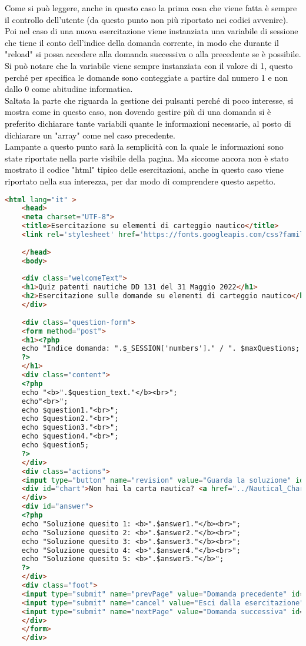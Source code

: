\textcolor{black}{Come si può leggere, anche in questo caso la prima cosa che viene fatta è sempre il controllo dell'utente (da questo punto non più riportato nei codici avvenire).  Poi nel caso di una nuova esercitazione viene instanziata una variabile di sessione che tiene il conto dell'indice della domanda corrente, in modo che durante il "reload" si possa accedere alla domanda successiva o alla precedente se è possibile. Si può notare che la variabile viene sempre instanziata con il valore di 1, questo perché per specifica le domande sono conteggiate a partire dal numero 1 e non dallo 0 come abitudine informatica.\\
Saltata la parte che riguarda la gestione dei pulsanti perché di poco interesse, si mostra come in questo caso, non dovendo gestire più di una domanda si è preferito dichiarare tante variabili quante le informazioni necessarie, al posto di dichiarare un "array" come nel caso precedente.\\
Lampante a questo punto sarà la semplicità con la quale le informazioni sono state riportate nella parte visibile della pagina. Ma siccome ancora non è stato mostrato il codice "html" tipico delle esercitazioni, anche in questo caso viene riportato nella sua interezza, per dar modo di comprendere questo aspetto.}\\

\begin{lstlisting}[language=html]
	<html lang="it" >
	<head>
	<meta charset="UTF-8">
	<title>Esercitazione su elementi di carteggio nautico</title>
	<link rel='stylesheet' href='https://fonts.googleapis.com/css?family=Rubik:400,700'><link rel="stylesheet" href="exerciseStyle.css">
	
	</head>
	<body>  
	
	<div class="welcomeText">
	<h1>Quiz patenti nautiche DD 131 del 31 Maggio 2022</h1>
	<h2>Esercitazione sulle domande su elementi di carteggio nautico</h2>
	</div>
	
	<div class="question-form">
	<form method="post">
	<h1><?php
	echo "Indice domanda: ".$_SESSION['numbers']." / ". $maxQuestions;
	?>
	</h1>
	<div class="content">
	<?php 
	echo "<b>".$question_text."</b><br>";
	echo"<br>";
	echo $question1."<br>";
	echo $question2."<br>";
	echo $question3."<br>";
	echo $question4."<br>";
	echo $question5;
	?> 
	</div>
	<div class="actions">
	<input type="button" name="revision" value="Guarda la soluzione" id="revision" onclick="check()"/>
	<div id="chart">Non hai la carta nautica? <a href="../Nautical_Charts/Carta_Nautica_5D.pdf" download> Scaricala qui</a></div>
	</div>
	<div id="answer">
	<?php
	echo "Soluzione quesito 1: <b>".$answer1."</b><br>";
	echo "Soluzione quesito 2: <b>".$answer2."</b><br>";
	echo "Soluzione quesito 3: <b>".$answer3."</b><br>";
	echo "Soluzione quesito 4: <b>".$answer4."</b><br>";
	echo "Soluzione quesito 5: <b>".$answer5."</b>";
	?>
	</div>
	<div class="foot">
	<input type="submit" name="prevPage" value="Domanda precedente" id="button3"/>
	<input type="submit" name="cancel" value="Esci dalla esercitazione" id="button2"/>
	<input type="submit" name="nextPage" value="Domanda successiva" id="button1"/>
	</div>
	</form>
	</div>
\end{lstlisting}

